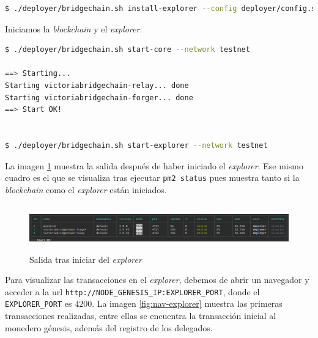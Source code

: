 \begin{lstlisting}[language=Bash,caption=Instalación \textit{blockchain}. Parte X, label=cod:suma-cuerpo, style=Consola]
$ ./deployer/bridgechain.sh install-explorer --config deployer/config.sample.conf --skip-deps --non-interactive
\end{lstlisting}



Iniciamos la \textit{blockchain} y el \textit{explorer}.\\

\begin{lstlisting}[language=Bash,caption=Instalación \textit{blockchain}. Parte XII, label=cod:suma-cuerpo, style=Consola]
$ ./deployer/bridgechain.sh start-core --network testnet

==> Starting...
Starting victoriabridgechain-relay... done
Starting victoriabridgechain-forger... done
==> Start OK!


$ ./deployer/bridgechain.sh start-explorer --network testnet
\end{lstlisting}

La imagen \ref{fig:install-explorer} muestra la salida después de haber iniciado el \textit{explorer}. Ese mismo cuadro es el que se visualiza tras ejecutar \texttt{pm2 status} pues muestra tanto si la \textit{blockchain} como el \textit{explorer} están iniciados.

\begin{figure}[h]
	\centering
	\includegraphics[width=14.5cm,height=2cm]{figuras/Instalacion_explorer.png}
	\caption{Salida tras iniciar del \textit{explorer}}
	\label{fig:install-explorer}
\end{figure}

Para visualizar las transacciones en el \textit{explorer}, debemos de abrir un navegador y acceder a la url \texttt{http://NODE\_GENESIS\_IP:EXPLORER\_PORT}, donde el \texttt{EXPLORER\_PORT} es $4200$. La imagen \ref{fig:nav-explorer} muestra las primeras transacciones realizadas, entre ellas se encuentra la transacción inicial al monedero génesis, además del registro de los delegados.

